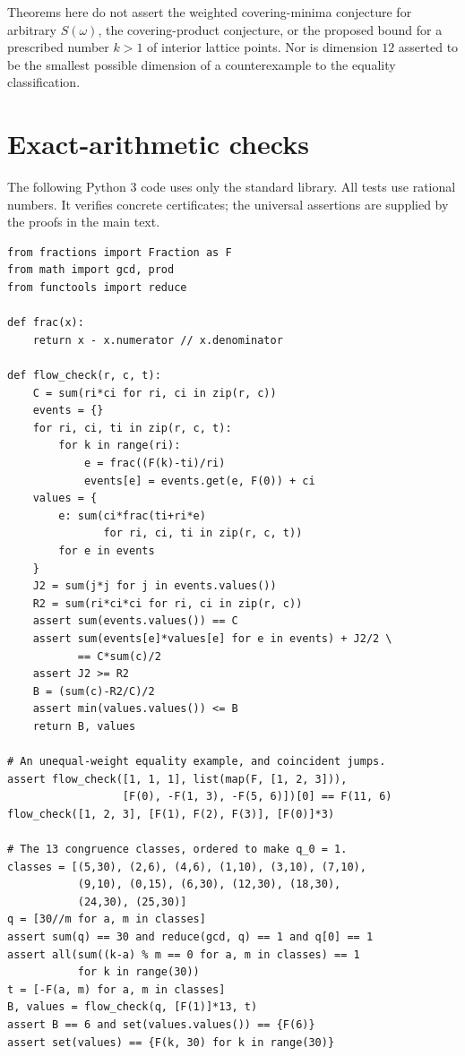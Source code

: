 \documentclass[11pt,a4paper]{article}
\theoremstyle{definition}\newtheorem{definition}[theorem]{Definition}
\theoremstyle{remark}\newtheorem{remark}[theorem]{Remark}
\begin{document}
Theorems here do not assert the weighted covering-minima conjecture
for arbitrary $S(\omega)$, the covering-product conjecture, or the
proposed bound for a prescribed number $k>1$ of interior lattice
points. Nor is dimension $12$ asserted to be the smallest possible
dimension of a counterexample to the equality classification.

\appendix
\section{Exact-arithmetic checks}
\label{app:code}
The following Python 3 code uses only the standard library.
All tests use rational numbers. It verifies concrete certificates;
the universal assertions are supplied by the proofs in the main text.
\begin{Verbatim}[fontsize=\footnotesize,frame=single,framesep=3mm]
from fractions import Fraction as F
from math import gcd, prod
from functools import reduce

def frac(x):
    return x - x.numerator // x.denominator

def flow_check(r, c, t):
    C = sum(ri*ci for ri, ci in zip(r, c))
    events = {}
    for ri, ci, ti in zip(r, c, t):
        for k in range(ri):
            e = frac((F(k)-ti)/ri)
            events[e] = events.get(e, F(0)) + ci
    values = {
        e: sum(ci*frac(ti+ri*e)
               for ri, ci, ti in zip(r, c, t))
        for e in events
    }
    J2 = sum(j*j for j in events.values())
    R2 = sum(ri*ci*ci for ri, ci in zip(r, c))
    assert sum(events.values()) == C
    assert sum(events[e]*values[e] for e in events) + J2/2 \
           == C*sum(c)/2
    assert J2 >= R2
    B = (sum(c)-R2/C)/2
    assert min(values.values()) <= B
    return B, values

# An unequal-weight equality example, and coincident jumps.
assert flow_check([1, 1, 1], list(map(F, [1, 2, 3])),
                  [F(0), -F(1, 3), -F(5, 6)])[0] == F(11, 6)
flow_check([1, 2, 3], [F(1), F(2), F(3)], [F(0)]*3)

# The 13 congruence classes, ordered to make q_0 = 1.
classes = [(5,30), (2,6), (4,6), (1,10), (3,10), (7,10),
           (9,10), (0,15), (6,30), (12,30), (18,30),
           (24,30), (25,30)]
q = [30//m for a, m in classes]
assert sum(q) == 30 and reduce(gcd, q) == 1 and q[0] == 1
assert all(sum((k-a) % m == 0 for a, m in classes) == 1
           for k in range(30))
t = [-F(a, m) for a, m in classes]
B, values = flow_check(q, [F(1)]*13, t)
assert B == 6 and set(values.values()) == {F(6)}
assert set(values) == {F(k, 30) for k in range(30)}


\end{Verbatim}
\end{document}
